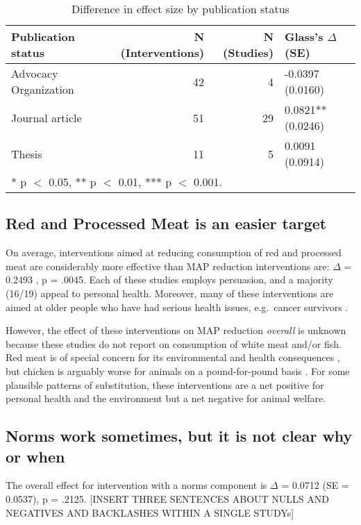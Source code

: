\documentclass[sn-nature,pdflatex]{sn-jnl}
\begin{document}
\begin{table}[!h]
\centering
\caption{\label{tab:tab:table_two}Difference in effect size by publication status}
\centering
\begin{tabular}[t]{lrrl}
\toprule
Publication status & N (Interventions) & N (Studies) & Glass's $\Delta$ (SE)\\
\midrule
Advocacy Organization & 42 & 4 & -0.0397 (0.0160)\\
Journal article & 51 & 29 & 0.0821** (0.0246)\\
Thesis & 11 & 5 & 0.0091 (0.0914)\\
\bottomrule
\multicolumn{4}{l}{\rule{0pt}{1em}* p $<$ 0.05, ** p $<$ 0.01, *** p $<$ 0.001.}\\
\end{tabular}
\end{table}

\subsection{Red and Processed Meat is an easier
target}\label{red-and-processed-meat-is-an-easier-target}

On average, interventions aimed at reducing consumption of red and
processed meat are considerably more effective than MAP reduction
interventions are: \(\Delta\) = 0.2493 , p = .0045.
Each of these studies employs persuasion, and a majority (16/19) appeal
to personal health. Moreover, many of these interventions are aimed at
older people who have had serious health issues, e.g.~cancer survivors
\citep{lee2018, james2015}.

However, the effect of these interventions on MAP reduction
\emph{overall} is unknown because these studies do not report on
consumption of white meat and/or fish. Red meat is of special concern
for its environmental and health consequences \citep{grummon2023}, but
chicken is arguably worse for animals on a pound-for-pound basis
\citep{mathur2022ethical}. For some plausible patterns of substitution,
these interventions are a net positive for personal health and the
environment but a net negative for animal welfare.

\subsection{Norms work sometimes, but it is not clear why or
when}\label{norms-work-sometimes-but-it-is-not-clear-why-or-when}

The overall effect for intervention with a norms component is \(\Delta\)
= 0.0712 (SE = 0.0537), p = .2125. {[}INSERT THREE SENTENCES ABOUT NULLS
AND NEGATIVES AND BACKLASHES WITHIN A SINGLE STUDYs{]}
\end{document}
